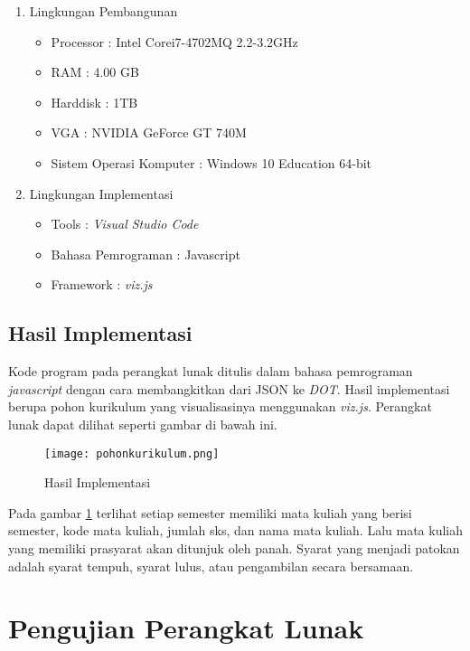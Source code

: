 \begin{enumerate}
\item Lingkungan Pembangunan 
\begin{itemize}
\item Processor : Intel Corei7-4702MQ 2.2-3.2GHz
\item RAM : 4.00 GB
\item Harddisk : 1TB
\item VGA : NVIDIA GeForce GT 740M
\item Sistem Operasi Komputer : Windows 10 Education 64-bit
\end{itemize}

\item Lingkungan Implementasi
\begin{itemize}
\item Tools : \textit{Visual Studio Code}
\item Bahasa Pemrograman : Javascript
\item Framework : \textit{viz.js}
\end{itemize}

\end{enumerate}

\subsection{Hasil Implementasi}
\label{sec: Hasil Implementasi}

Kode program pada perangkat lunak ditulis dalam bahasa pemrograman \textit{javascript} dengan cara membangkitkan dari JSON ke \textit{DOT}. Hasil implementasi berupa pohon kurikulum yang visualisasinya menggunakan \textit{viz.js}. Perangkat lunak dapat dilihat seperti gambar di bawah ini.

\begin{figure}[H]
		\texttt{[image: pohonkurikulum.png]}
		\caption{Hasil Implementasi}
		\label{fig: pohon kurikulum}
\end{figure}	 

Pada gambar \ref{fig: pohon kurikulum} terlihat setiap semester memiliki mata kuliah yang berisi semester, kode mata kuliah, jumlah sks, dan nama mata kuliah. Lalu mata kuliah yang memiliki prasyarat akan ditunjuk oleh panah. Syarat yang menjadi patokan adalah syarat tempuh, syarat lulus, atau pengambilan secara bersamaan.

\section{Pengujian Perangkat Lunak}
\label{sec: Pengujian Perangkat Lunak}

